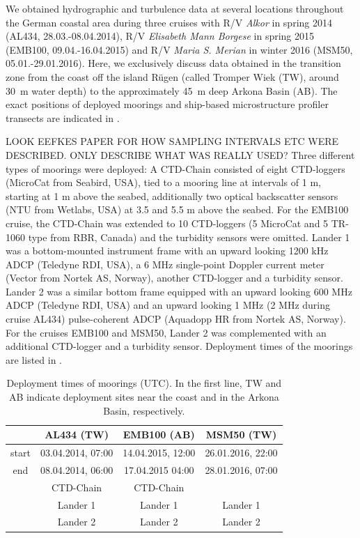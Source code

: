 We obtained hydrographic and turbulence data at 
several locations throughout the German coastal area during three cruises with 
R/V \textit{Alkor} in spring 2014 (AL434, 28.03.-08.04.2014), R/V 
\textit{Elisabeth Mann Borgese} in spring 2015 (EMB100, 09.04.-16.04.2015) and 
R/V \textit{Maria S. Merian} in winter 2016 (MSM50, 05.01.-29.01.2016). Here, 
we exclusively discuss data obtained in the transition zone from the coast off 
the island R\"{u}gen (called Tromper Wiek (TW), around 30~m water depth) to 
the approximately 45~m deep Arkona Basin (AB). The exact positions of deployed 
moorings and ship-based microstructure profiler transects are indicated in 
.

LOOK EEFKES PAPER FOR HOW SAMPLING INTERVALS ETC WERE DESCRIBED. ONLY 
DESCRIBE WHAT WAS REALLY USED? Three different types of moorings were deployed: 
A CTD-Chain consisted of eight 
CTD-loggers (MicroCat from Seabird, USA), tied to a mooring line at intervals 
of 1 m, starting at 1 m above the seabed, additionally two optical 
backscatter sensors (NTU from Wetlabs, USA) at 3.5 and 5.5 m above the seabed. 
For the EMB100 cruise, the CTD-Chain was extended to 10 CTD-loggers (5 MicroCat 
and 5 TR-1060 type from RBR, Canada) and the turbidity sensors were omitted. 
Lander 1 was a bottom-mounted instrument frame with an upward looking 1200 kHz 
ADCP (Teledyne RDI, USA), a 6 MHz single-point Doppler current meter (Vector 
from Nortek AS, Norway), another CTD-logger and a turbidity sensor. Lander 2 
was a similar bottom frame equipped with an upward looking 600 MHz ADCP 
(Teledyne RDI, USA) and an upward looking 1 MHz (2 MHz during cruise AL434) 
pulse-coherent ADCP (Aquadopp HR from Nortek AS, Norway). For the cruises 
EMB100 and MSM50, Lander 2 was complemented with an additional CTD-logger and a 
turbidity sensor. Deployment times of the moorings are listed in 
.

 \begin{table}
\caption{Deployment times of moorings (UTC). In the first 
line, TW and AB indicate deployment sites near the coast and in the Arkona 
Basin, respectively.}\label{deployments}
\begin{center}
\begin{tabular}{cccc}
 & AL434 (TW) & EMB100 (AB) & MSM50 (TW) \\
 \hline
 start & 03.04.2014, 07:00 & 14.04.2015, 12:00 & 26.01.2016, 22:00 \\ 
 end & 08.04.2014, 06:00 & 17.04.2015 04:00 & 28.01.2016, 07:00 \\
\hline
 & CTD-Chain & CTD-Chain & \\
 & Lander 1 & Lander 1 & Lander 1\\
 & Lander 2 & Lander 2 & Lander 2\\
\end{tabular}
\end{center}
\end{table}

